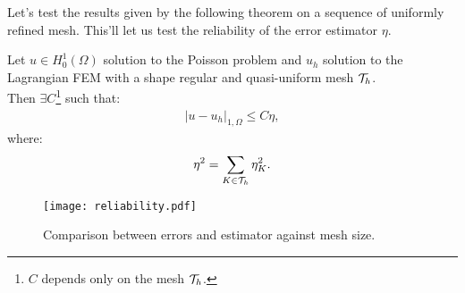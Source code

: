 Let's test the results given by the following theorem on a sequence of uniformly refined mesh. This'll let us test the reliability of the error estimator $\eta$.

\begin{theorem}[Reliability]
	Let $u \in H_0^1(\Omega)$ solution to the Poisson problem and $u_h$ solution to the Lagrangian FEM with a shape regular and quasi-uniform mesh $\mathcal{T}_h$. \\
	Then $\exists C$\footnote{$C$ depends only on the mesh $\mathcal{T}_h$.} such that:
	\begin{gather}
		\lvert u - u_h \rvert_{1, \Omega} \leq C \eta,
	\end{gather}
	where:
	\begin{gather}
		\eta^2 = \sum_{K \in \mathcal{T}_h} \eta_K^2.
	\end{gather}
\end{theorem}

\begin{figure}[!ht]
	\centering
	\texttt{[image: reliability.pdf]}
	\caption{Comparison between errors and estimator against mesh size.}
\end{figure}

\newpage
